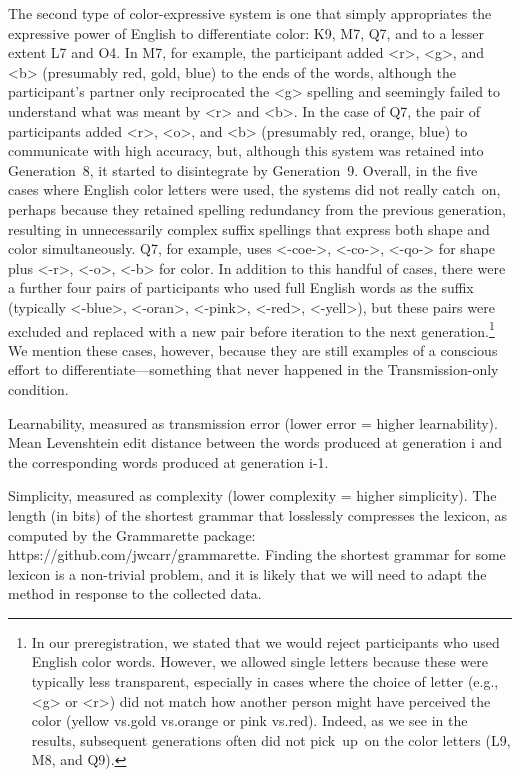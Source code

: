 \documentclass[doc,biblatex]{apa7}
\begin{document}
The second type of color-expressive system is one that simply appropriates the expressive power of English to differentiate color: K9, M7, Q7, and to a lesser extent L7 and O4. In M7, for example, the participant added <r>, <g>, and <b> (presumably red, gold, blue) to the ends of the words, although the participant's partner only reciprocated the <g> spelling and seemingly failed to understand what was meant by <r> and <b>. In the case of Q7, the pair of participants added <r>, <o>, and <b> (presumably red, orange, blue) to communicate with high accuracy, but, although this system was retained into Generation~8, it started to disintegrate by Generation~9. Overall, in the five cases where English color letters were used, the systems did not really catch~on, perhaps because they retained spelling redundancy from the previous generation, resulting in unnecessarily complex suffix spellings that express both shape and color simultaneously. Q7, for example, uses <-coe->, <-co->, <-qo-> for shape plus <-r>, <-o>, <-b> for color. In addition to this handful of cases, there were a further four pairs of participants who used full English words as the suffix (typically <-blue>, <-oran>, <-pink>, <-red>, <-yell>), but these pairs were excluded and replaced with a new pair before iteration to the next generation.\footnote{In our preregistration, we stated that we would reject participants who used English color words. However, we allowed single letters because these were typically less transparent, especially in cases where the choice of letter (e.g., <g> or <r>) did not match how another person might have perceived the color (yellow vs.\@ gold vs.\@ orange or pink vs.\@ red). Indeed, as we see in the results, subsequent generations often did not pick~up~on the color letters (L9, M8, and Q9).} We mention these cases, however, because they are still examples of a conscious effort to differentiate---something that never happened in the Transmission-only condition.



Learnability, measured as transmission error (lower error = higher learnability). Mean Levenshtein edit distance between the words produced at generation i and the corresponding words produced at generation i-1.

Simplicity, measured as complexity (lower complexity = higher simplicity). The length (in bits) of the shortest grammar that losslessly compresses the lexicon, as computed by the Grammarette package: https://github.com/jwcarr/grammarette. Finding the shortest grammar for some lexicon is a non-trivial problem, and it is likely that we will need to adapt the method in response to the collected data.
\end{document}
